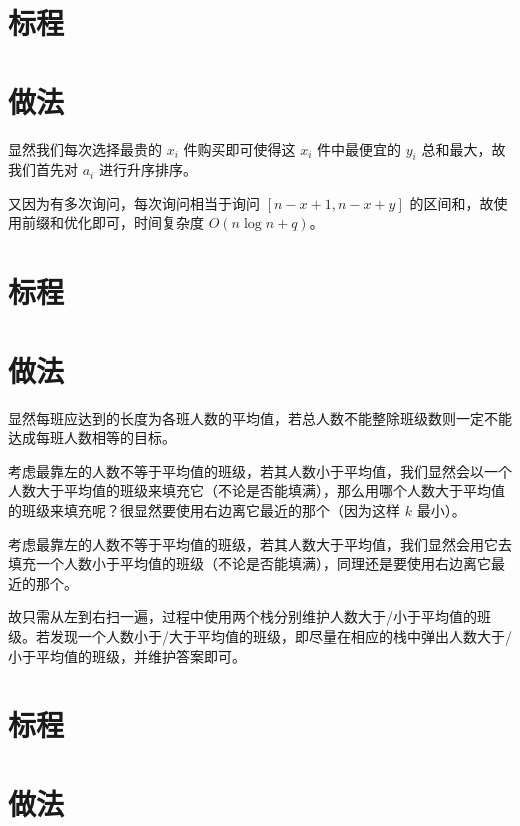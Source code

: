 \documentclass{../cpct/ctsol}
\begin{document}
\section*{标程}


\makesolution
\section*{做法}

显然我们每次选择最贵的 $x_i$ 件购买即可使得这 $x_i$ 件中最便宜的 $y_i$ 总和最大，故我们首先对 $a_i$ 进行升序排序。

又因为有多次询问，每次询问相当于询问 $[n-x+1, n-x+y]$ 的区间和，故使用前缀和优化即可，时间复杂度 $O(n \log n+q)$。

\section*{标程}


\makesolution
\section*{做法}

显然每班应达到的长度为各班人数的平均值，若总人数不能整除班级数则一定不能达成每班人数相等的目标。

考虑最靠左的人数不等于平均值的班级，若其人数小于平均值，我们显然会以一个人数大于平均值的班级来填充它（不论是否能填满），那么用哪个人数大于平均值的班级来填充呢？很显然要使用右边离它最近的那个（因为这样 $k$ 最小）。

考虑最靠左的人数不等于平均值的班级，若其人数大于平均值，我们显然会用它去填充一个人数小于平均值的班级（不论是否能填满），同理还是要使用右边离它最近的那个。

故只需从左到右扫一遍，过程中使用两个栈分别维护人数大于/小于平均值的班级。若发现一个人数小于/大于平均值的班级，即尽量在相应的栈中弹出人数大于/小于平均值的班级，并维护答案即可。

\section*{标程}


\makesolution
\section*{做法}
\end{document}
